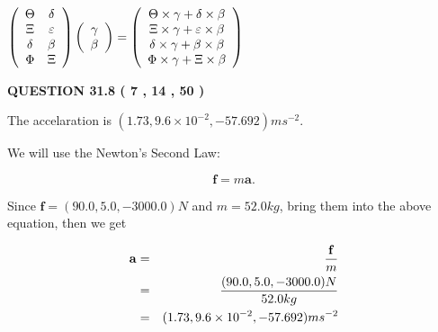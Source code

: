 \documentclass[12pt]{article}
\begin{document}
$  %
 \left( \begin{array}
 {
 c
 c
 }
 \Theta & 
 \delta \\ 
                    \Xi & 
 \varepsilon \\ 
 \delta & 
 \beta \\ 
 \Phi & 
                    \Xi
 \end{array} \right)
 \left( \begin{array}
 {
 c
 }
 \gamma \\ 
 \beta
 \end{array} \right)
=
 \left( \begin{array}
 {
 c
 }
  \Theta \times  \gamma +  \delta \times  \beta \\ 
                     \Xi \times  \gamma +  \varepsilon \times  \beta \\ 
  \delta \times  \gamma +  \beta \times  \beta \\ 
  \Phi \times  \gamma +                     \Xi \times  \beta
 \end{array} \right)
$
 
 
 
 
 
\noindent{}

 
 
  
\vspace{0.2in}
  
{\textbf{\Large{QUESTION
31.8 
 (           7 ,          14 ,          50 )
}}}
  
  
 
 
\noindent{}
 
 
  The accelaration is $  %
(
1.73,
9.6 \times 10^{-2},
-57.692)
ms^{-2} $.
 
 
 
 
 
 
\noindent{}

We will use the Newton's Second Law:
 
\[
\mathbf{f}=m\mathbf{a}.
\]
 
Since $\mathbf{f}= %
(90.0 , 5.0 , -3000.0) N$
and $m= %
52.0kg$, bring them into the above equation, then we get
 
\begin{eqnarray*}
\mathbf{a}&=&\frac{\mathbf{f}}m  \\
&=&\frac{ %
(90.0 , 5.0 , -3000.0) N}{ %
52.0kg}  \\
&=& %
(1.73 , 9.6 \times 10^{-2} , -57.692) ms^{-2}
\end{eqnarray*}
 
\end{document}
